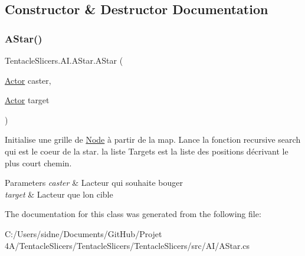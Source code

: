 \subsection{Constructor \& Destructor Documentation}
\mbox{\label{class_tentacle_slicers_1_1_a_i_1_1_a_star_a570118ce7fbe28c82c931e7523410bd3}} 
\subsubsection{\texorpdfstring{A\+Star()}{AStar()}}
{\footnotesize\ttfamily Tentacle\+Slicers.\+A\+I.\+A\+Star.\+A\+Star (\begin{DoxyParamCaption}\item[{\hyperlink{class_tentacle_slicers_1_1actors_1_1_actor}{Actor}}]{caster,  }\item[{\hyperlink{class_tentacle_slicers_1_1actors_1_1_actor}{Actor}}]{target }\end{DoxyParamCaption})}



Initialise une grille de \hyperlink{class_tentacle_slicers_1_1_a_i_1_1_node}{Node} à partir de la map. Lance la fonction recursive search qui est le coeur de l\textquotesingle{}a star. la liste Targets est la liste des positions décrivant le plus court chemin. 


\begin{DoxyParams}{Parameters}
{\em caster} & L\textquotesingle{}acteur qui souhaite bouger \\
\hline
{\em target} & L\textquotesingle{}acteur que l\textquotesingle{}on cible \\
\hline
\end{DoxyParams}


The documentation for this class was generated from the following file\+:\begin{DoxyCompactItemize}
\item 
C\+:/\+Users/sidne/\+Documents/\+Git\+Hub/\+Projet 4\+A/\+Tentacle\+Slicers/\+Tentacle\+Slicers/\+Tentacle\+Slicers/src/\+A\+I/A\+Star.\+cs\end{DoxyCompactItemize}
